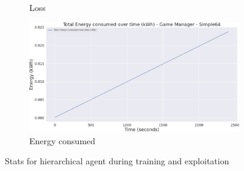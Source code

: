 \begin{figure}[h]
\begin{subfigure}[b]{0.495\textwidth}
        \caption{Loss}
    \end{subfigure}
    \begin{subfigure}[b]{0.495\textwidth}
        \includegraphics[width=1\textwidth]{figs/multi_dqn_game_manager/energy_consumed.png}
        \caption{Energy consumed}
    \end{subfigure}
    \caption{Stats for hierarchical agent during training and exploitation}
\end{figure}

